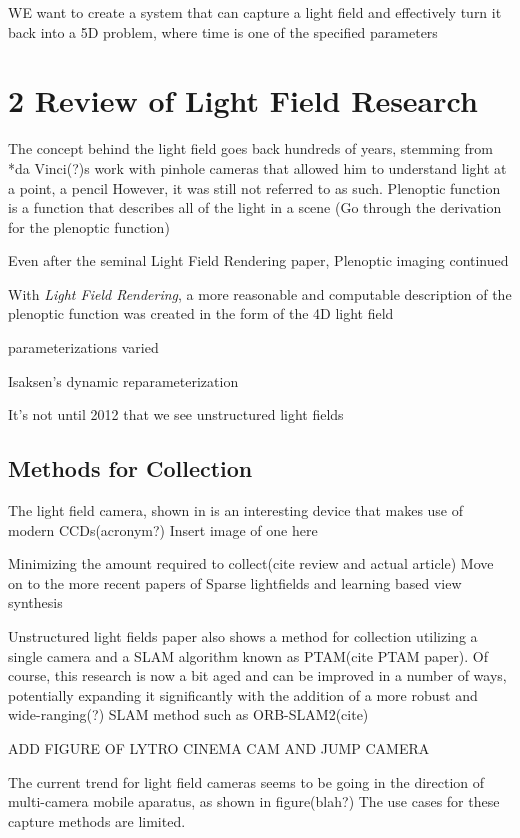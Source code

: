 \documentclass[12pt]{report}
\begin{document}
WE want to create a system that can capture a light field and effectively turn it back into a 5D problem, where time is one of the specified parameters

\chapter*{2 Review of Light Field Research}
The concept behind the light field goes back hundreds of years, stemming from *da Vinci(?)s work with pinhole cameras that allowed him to understand light at a point, a pencil
However, it was still not referred to as such. 
Plenoptic function \cite{Adelson91} is a function that describes all of the light in a scene
(Go through the derivation for the plenoptic function)

Even after the seminal Light Field Rendering paper, Plenoptic imaging continued

With \emph{Light Field Rendering}, a more reasonable and computable description of the plenoptic function was created in the form of the 4D light field

parameterizations varied

Isaksen's dynamic reparameterization

It's not until 2012 that we see unstructured light fields

\section*{Methods for Collection}
The light field camera, shown in \cite{Ng06} is an interesting device that makes use of modern CCDs(acronym?)
Insert image of one here

Minimizing the amount required to collect(cite review and actual article)
Move on to the more recent papers of Sparse lightfields and learning 
based view synthesis

Unstructured light fields paper also shows a method for collection utilizing a single camera and a SLAM algorithm known as PTAM(cite PTAM paper). Of course, this research is now a bit aged and can be improved in a number of ways, potentially expanding it significantly with the addition of a more robust and wide-ranging(?) SLAM method such as ORB-SLAM2(cite)


ADD FIGURE OF LYTRO CINEMA CAM AND JUMP CAMERA

The current trend for light field cameras seems to be going in the direction of multi-camera mobile aparatus, as shown in figure(blah?)
The use cases for these capture methods are limited. 
\end{document}
